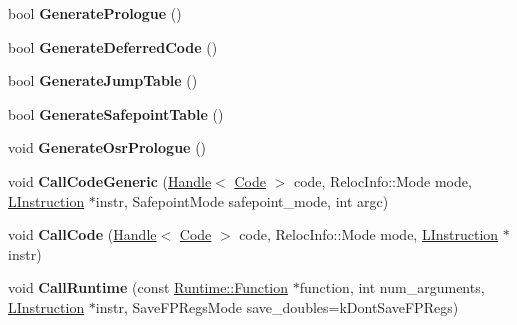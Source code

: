 \begin{DoxyCompactItemize}
\item 
bool {\bfseries Generate\+Prologue} ()\hypertarget{classv8_1_1internal_1_1_l_code_gen_aff05496f75e5706dc01028ef21cd2065}{}\label{classv8_1_1internal_1_1_l_code_gen_aff05496f75e5706dc01028ef21cd2065}

\item 
bool {\bfseries Generate\+Deferred\+Code} ()\hypertarget{classv8_1_1internal_1_1_l_code_gen_a7edbe3129e1ff758f4c3d471d6038aee}{}\label{classv8_1_1internal_1_1_l_code_gen_a7edbe3129e1ff758f4c3d471d6038aee}

\item 
bool {\bfseries Generate\+Jump\+Table} ()\hypertarget{classv8_1_1internal_1_1_l_code_gen_af066f353885f2f3cec35f74445989328}{}\label{classv8_1_1internal_1_1_l_code_gen_af066f353885f2f3cec35f74445989328}

\item 
bool {\bfseries Generate\+Safepoint\+Table} ()\hypertarget{classv8_1_1internal_1_1_l_code_gen_aa8cc24b1134b87ea8ce0a9a5c5688b5a}{}\label{classv8_1_1internal_1_1_l_code_gen_aa8cc24b1134b87ea8ce0a9a5c5688b5a}

\item 
void {\bfseries Generate\+Osr\+Prologue} ()\hypertarget{classv8_1_1internal_1_1_l_code_gen_a911d24be4ac4e392d736d9769b7ebb8f}{}\label{classv8_1_1internal_1_1_l_code_gen_a911d24be4ac4e392d736d9769b7ebb8f}

\item 
void {\bfseries Call\+Code\+Generic} (\hyperlink{classv8_1_1internal_1_1_handle}{Handle}$<$ \hyperlink{classv8_1_1internal_1_1_code}{Code} $>$ code, Reloc\+Info\+::\+Mode mode, \hyperlink{classv8_1_1internal_1_1_l_instruction}{L\+Instruction} $\ast$instr, Safepoint\+Mode safepoint\+\_\+mode, int argc)\hypertarget{classv8_1_1internal_1_1_l_code_gen_a7b3d28dc40d2a7bb57ed5d432f9c0be7}{}\label{classv8_1_1internal_1_1_l_code_gen_a7b3d28dc40d2a7bb57ed5d432f9c0be7}

\item 
void {\bfseries Call\+Code} (\hyperlink{classv8_1_1internal_1_1_handle}{Handle}$<$ \hyperlink{classv8_1_1internal_1_1_code}{Code} $>$ code, Reloc\+Info\+::\+Mode mode, \hyperlink{classv8_1_1internal_1_1_l_instruction}{L\+Instruction} $\ast$instr)\hypertarget{classv8_1_1internal_1_1_l_code_gen_aca293066a99024759f94b995c6ba5ce5}{}\label{classv8_1_1internal_1_1_l_code_gen_aca293066a99024759f94b995c6ba5ce5}

\item 
void {\bfseries Call\+Runtime} (const \hyperlink{structv8_1_1internal_1_1_runtime_1_1_function}{Runtime\+::\+Function} $\ast$function, int num\+\_\+arguments, \hyperlink{classv8_1_1internal_1_1_l_instruction}{L\+Instruction} $\ast$instr, Save\+F\+P\+Regs\+Mode save\+\_\+doubles=k\+Dont\+Save\+F\+P\+Regs)\hypertarget{classv8_1_1internal_1_1_l_code_gen_ac9553032ed88d8b7b9a408c04124781f}{}\label{classv8_1_1internal_1_1_l_code_gen_ac9553032ed88d8b7b9a408c04124781f}


\end{DoxyCompactItemize}
